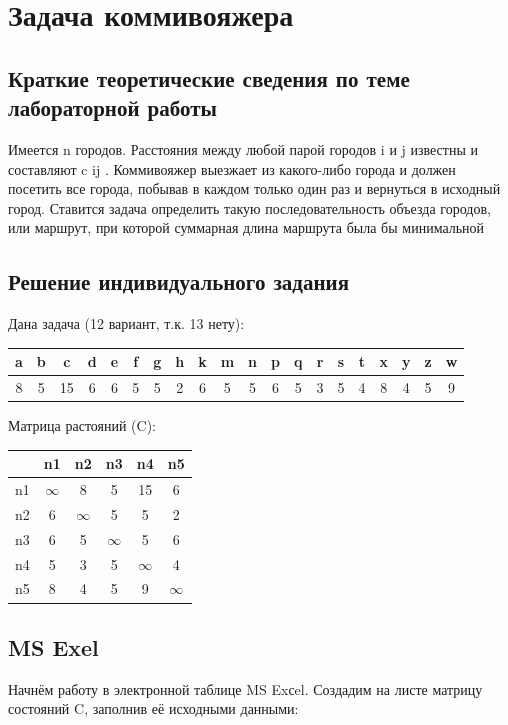 \documentclass[a4paper, 12pt]{article}
\begin{document}
\newpage
\section{Задача коммивояжера}
\subsection{Краткие теоретические сведения по теме лабораторной работы}
Имеется n городов. Расстояния между любой парой городов i и j известны и составляют c ij . Коммивояжер выезжает из какого-либо города и должен посетить все города, побывав в каждом только один раз и вернуться в исходный город. Ставится задача определить такую последовательность объезда городов, или маршрут, при которой суммарная длина маршрута была бы минимальной
\subsection{Решение индивидуального задания}
Дана задача (12 вариант, т.к. 13 нету):
\begin{table}[H]
\centering
\begin{tabular}{|c|c|c|c|c|c|c|c|c|c|c|c|c|c|c|c|c|c|c|c|}
\hline
a & b & c & d & e & f & g & h & k & m & n & p & q & r & s & t & x & y & z & w \\ \hline
8 & 5 & 15& 6 & 6 & 5 & 5 & 2 & 6 & 5 & 5 & 6 & 5 & 3 & 5 & 4 & 8 & 4 & 5 & 9 \\ \hline
\end{tabular}
\end{table}

Матрица растояний (C):
\begin{table}[H]
\centering
\begin{tabular}{c|c|c|c|c|c|}
  &n1      &n2      &n3      &n4      &n5      \\ \hline
n1&$\infty$&8       &5       &15      &6       \\ \hline
n2&6       &$\infty$&5       &5       &2       \\ \hline
n3&6       &5       &$\infty$&5       &6       \\ \hline
n4&5       &3       &5       &$\infty$&4       \\ \hline
n5&8       &4       &5       &9       &$\infty$\\ \hline
\end{tabular}
\end{table}

\newpage
\subsection{MS Exel}
Начнём работу в электронной таблице MS Exсel. Создадим на листе матрицу состояний C, заполнив её исходными данными:\\
\end{document}
